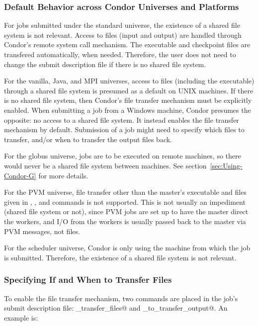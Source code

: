 \subsubsection{Default Behavior across Condor Universes and Platforms}

For jobs submitted under the standard universe,
the existence of a shared file system is not relevant.
Access to files (input and output) are handled through Condor's
remote system call mechanism.
The executable and checkpoint files are transfered automatically, when
needed. 
Therefore, the user does not need to change the submit description
file if there is no shared file system.

For the vanilla, Java, and MPI universes, access to files (including
the executable) through a shared file system is presumed as a default
on UNIX machines.
If there is no shared file system, then Condor's file transfer
mechanism must be explicitly enabled.
When submitting a job from a Windows machine,
Condor presumes the opposite: no access to a shared file system.
It instead enables the file transfer mechanism by default.
Submission of a job might need to specify which files to
transfer, and/or when to transfer the output files back.

For the globus universe,
jobs are to be executed on remote machines, so there would never
be a shared file system between machines.
See section~\ref{sec:Using-Condor-G} for more details.

For the PVM universe,
file transfer other than the master's executable and files given in
\verb@input@,
\verb@output@, and
\verb@error@ commands is not supported.
This is not usually an impediment (shared file system or not), since
PVM jobs are set up to have the master direct the workers, and I/O
from the workers is usually passed back to the master via PVM
messages, not files.

For the scheduler universe,
Condor is only using the machine from which the job is submitted.
Therefore, the existence of a shared file system is not relevant.


\subsubsection{Specifying If and When to Transfer Files}

To enable the file transfer mechanism, two commands are
placed in the job's submit description file:
\verb@should_transfer_files@ and \verb@when_to_transfer_output@.
An example is:

